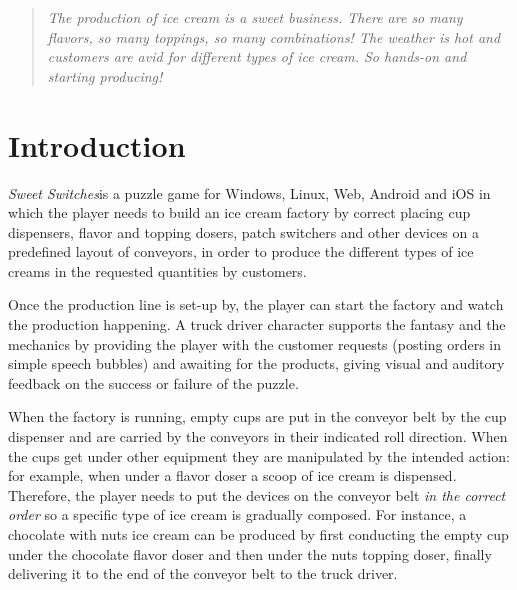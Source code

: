 \documentclass[a4paper]{scrartcl}
\title{\gamename}
\subtitle{Game Design Document}
\author{}
\date{\today}
\begin{document}
\newcommand{\gamename}{\emph{Sweet Switches}}

\maketitle

    \begin{quotation}
        \noindent
        \textit{The production of ice cream is a sweet business. There are so
                many flavors, so many toppings, so many combinations! The
                weather is hot and customers are avid for different types of ice
                cream. So hands-on and starting producing!}
    \end{quotation}

\section{Introduction}
    \gamename is a puzzle game for Windows, Linux, Web, Android and iOS in which
    the player needs to build an ice cream factory by correct placing cup
    dispensers, flavor and topping dosers, patch switchers and other devices on
    a predefined layout of conveyors, in order to produce the different types of
    ice creams in the requested quantities by customers.

    Once the production line is set-up by, the player can start the factory and
    watch the production happening. A truck driver character supports the
    fantasy and the mechanics by providing the player with the customer requests
    (posting orders in simple speech bubbles) and awaiting for the products,
    giving visual and auditory feedback on the success or failure of the puzzle.

    When the factory is running, empty cups are put in the conveyor belt by the
    cup dispenser and are carried by the conveyors in their indicated roll
    direction. When the cups get under other equipment they are manipulated by
    the intended action: for example, when under a flavor doser a scoop of ice
    cream is dispensed. Therefore, the player needs to put the devices on the
    conveyor belt \textit{in the correct order} so a specific type of ice cream
    is gradually composed. For instance, a chocolate with nuts ice cream can be
    produced by first conducting the empty cup under the chocolate flavor doser
    and then under the nuts topping doser, finally delivering it to the end of
    the conveyor belt to the truck driver.
\end{document}
